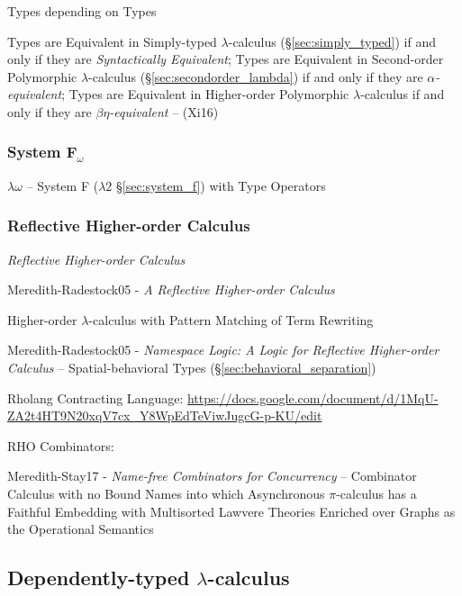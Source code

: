 Types depending on Types

Types are Equivalent in Simply-typed $\lambda$-calculus
(\S\ref{sec:simply_typed}) if and only if they are \emph{Syntactically
  Equivalent}; Types are Equivalent in Second-order Polymorphic
$\lambda$-calculus (\S\ref{sec:secondorder_lambda}) if and only if
they are \emph{$\alpha$-equivalent}; Types are Equivalent in
Higher-order Polymorphic $\lambda$-calculus if and only if they are
\emph{$\beta\eta$-equivalent} -- (Xi16)



\subsubsection{System F$_\omega$}\label{sec:system_fomega}

$\lambda\omega$ -- System F ($\lambda2$ \S\ref{sec:system_f}) with
Type Operators



\subsubsection{Reflective Higher-order Calculus}\label{sec:rho_calculus}

\emph{Reflective Higher-order Calculus}

Meredith-Radestock05 - \emph{A Reflective Higher-order Calculus}


Higher-order $\lambda$-calculus with Pattern Matching of Term
Rewriting %

Meredith-Radestock05 - \emph{Namespace Logic: A Logic for Reflective
  Higher-order Calculus} -- Spatial-behavioral Types
(\S\ref{sec:behavioral_separation})

Rholang Contracting Language:
\url{https://docs.google.com/document/d/1MqU-ZA2t4HT9N20xqV7cx_Y8WpEdTeViwJugcG-p-KU/edit}

RHO Combinators:

Meredith-Stay17 - \emph{Name-free Combinators for Concurrency} --
Combinator Calculus with no Bound Names into which Asynchronous
$\pi$-calculus has a Faithful Embedding with Multisorted Lawvere
Theories Enriched over Graphs as the Operational Semantics



\subsection{Dependently-typed $\lambda$-calculus}
\label{sec:dependent_lambda}

